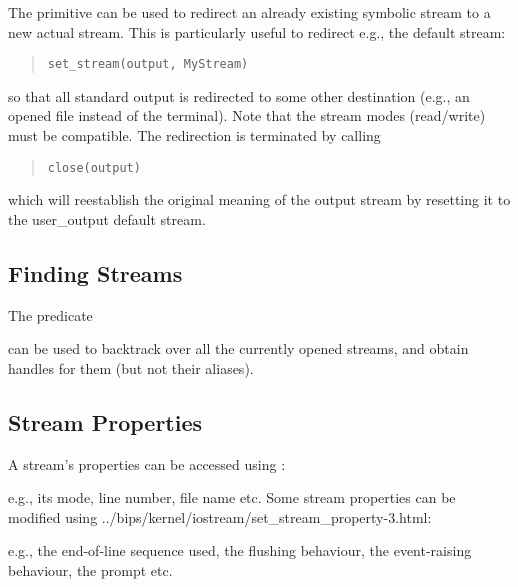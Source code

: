 The 
primitive can be used to redirect an already existing symbolic stream
to a new actual stream.
This is particularly useful to redirect e.g., the default 
stream:
\begin{quote}
\begin{verbatim}
set_stream(output, MyStream)
\end{verbatim}
\end{quote}
so that all standard output is redirected to some other destination
(e.g., an opened file instead of the terminal).
Note that the stream modes (read/write) must be compatible.
The redirection is terminated by calling
\begin{quote}
\begin{verbatim}
close(output)
\end{verbatim}
\end{quote}
which will reestablish the original meaning of the output stream
by resetting it to the user_output default stream.


\subsection{Finding Streams}
The predicate
\begin{quote}
\end{quote}
can be used to backtrack over all the currently opened streams,
and obtain handles for them (but not their aliases).


\subsection{Stream Properties}
A stream's properties can be accessed using
:
\begin{quote}
\end{quote}
e.g., its mode, line number, file name etc.
Some stream properties can be modified using
%
{../bips/kernel/iostream/set_stream_property-3.html}:
\begin{quote}
\end{quote}
e.g., the end-of-line sequence used, the flushing behaviour, the event-raising
behaviour, the prompt etc.


